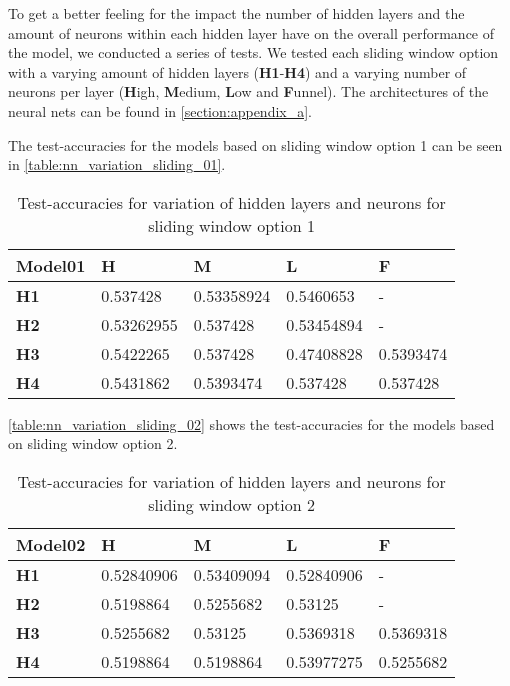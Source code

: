 To get a better feeling for the impact the number of hidden layers and the amount of neurons within each hidden layer have on the overall performance of the model, we conducted a series of tests.\newline
We tested each sliding window option with a varying amount of hidden layers (\textbf{H1}-\textbf{H4}) and a varying number of neurons per layer (\textbf{H}igh, \textbf{M}edium, \textbf{L}ow and \textbf{F}unnel).\newline
The architectures of the neural nets can be found in \autoref{section:appendix_a}.\newline

The test-accuracies for the models based on sliding window option 1 can be seen in \autoref{table:nn_variation_sliding_01}.

\begin{table}
\centering
\begin{tabular}{|l|l|l|l|l|}
\hline

\textbf{Model01} & \textbf{H} & \textbf{M} & \textbf{L} & \textbf{F} \\ \hline
\textbf{H1} & 0.537428 & 0.53358924 & 0.5460653 & - \\ \hline
\textbf{H2} & 0.53262955 & 0.537428 & 0.53454894 & - \\ \hline
\textbf{H3} & 0.5422265 & 0.537428 & 0.47408828 & 0.5393474 \\ \hline
\textbf{H4} & 0.5431862 & 0.5393474 & 0.537428 & 0.537428 \\ \hline

\end{tabular}
\caption{Test-accuracies for variation of hidden layers and neurons for sliding window option 1}
\label{table:nn_variation_sliding_01}
\end{table}

\autoref{table:nn_variation_sliding_02} shows the test-accuracies for the models based on sliding window option 2.

\begin{table}
\centering
\begin{tabular}{|l|l|l|l|l|}
\hline

\textbf{Model02} & \textbf{H} & \textbf{M} & \textbf{L} & \textbf{F} \\ \hline
\textbf{H1} & 0.52840906 & 0.53409094 & 0.52840906 & - \\ \hline
\textbf{H2} & 0.5198864 & 0.5255682 & 0.53125 & - \\ \hline
\textbf{H3} & 0.5255682 & 0.53125 & 0.5369318 & 0.5369318 \\ \hline
\textbf{H4} & 0.5198864 & 0.5198864 & 0.53977275 & 0.5255682 \\ \hline

\end{tabular}
\caption{Test-accuracies for variation of hidden layers and neurons for sliding window option 2}
\label{table:nn_variation_sliding_02}
\end{table}


